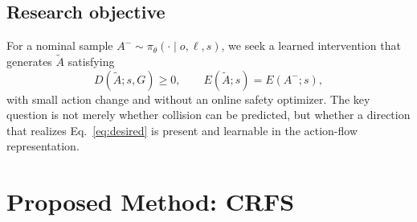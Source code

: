 \documentclass[10pt,conference]{IEEEtran}
\newcommand{\method}{\textsc{CRFS}}
\newcommand{\1}{\mathbf{1}}
\begin{document}
\subsection{Research objective}

For a nominal sample $A^-\sim\pi_\theta(\cdot\mid o,\ell,s)$, we seek a learned intervention that generates $\widetilde A$ satisfying
\begin{equation}
    D(\widetilde A;s,G)\geq 0,
    \qquad
    E(\widetilde A;s)=E(A^-;s),
    \label{eq:desired}
\end{equation}
with small action change and without an online safety optimizer. The key question is not merely whether collision can be predicted, but whether a direction that realizes Eq.~\eqref{eq:desired} is present and learnable in the action-flow representation.

\section{Proposed Method: \method{}}
\end{document}
